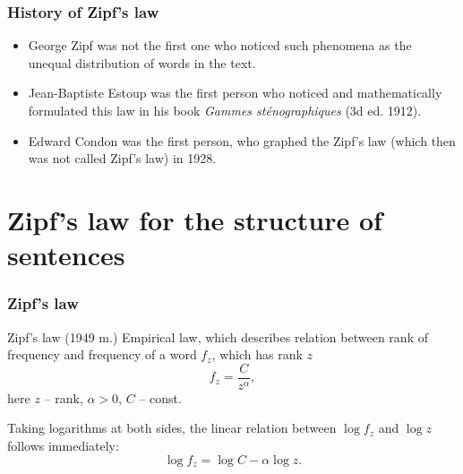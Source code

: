\documentclass{beamer}
\begin{document}


\begin{frame}
\frametitle{History of Zipf's law}

\begin{itemize}
\item George Zipf was not the first one who noticed such phenomena as the unequal 
distribution of words in the text.
\item Jean-Baptiste Estoup was the first person who noticed and 
mathematically formulated this law in his book \textit{Gammes 
sténographiques} (3d ed. 1912).
\item Edward Condon was the first person, who graphed the Zipf's law (which 
then was not called Zipf's law) in 1928. 
\end{itemize}
\end{frame}



\section{Zipf's law for the structure of sentences}
%
\begin{frame}
\frametitle{Zipf's law}
%
\begin{block}{Zipf's law (1949 m.)}
Empirical law, which describes relation between rank of frequency and 
frequency of a word $f_z$, which has rank $z$
%
\begin{equation} \label{f. zipf_nelog}
f_z = \dfrac{C}{z^\alpha},
\end{equation}
here $z$ -- rank, $\alpha > 0$, $C$ -- const.
%
\end{block}
%
%
\begin{block}{}
Taking logarithms at both sides, the linear relation between 
$\log f_z$  and $\log z$ follows immediately:
%
\begin{equation}
\log f_z = \log C - \alpha\log z.
\end{equation}
%
\end{block}
%
%
\end{frame}
\end{document}
